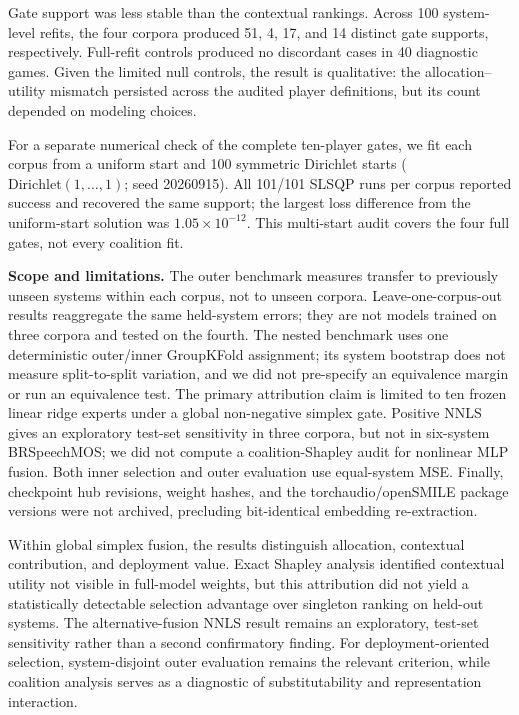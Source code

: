 \documentclass{article}
\begin{document}
Gate support was less stable than the contextual rankings. Across 100
system-level refits, the four corpora produced 51, 4, 17, and 14 distinct gate
supports, respectively. Full-refit controls produced no discordant cases in 40
diagnostic games. Given the limited null controls, the result is qualitative:
the allocation--utility mismatch persisted across the audited player
definitions, but its count depended on modeling choices.

For a separate numerical check of the complete ten-player gates, we fit each
corpus from a uniform start and 100 symmetric Dirichlet starts
($\mathrm{Dirichlet}(1,\ldots,1)$; seed 20260915). All 101/101 SLSQP runs per
corpus reported success and recovered the same support; the largest loss
difference from the uniform-start solution was $1.05\times10^{-12}$. This
multi-start audit covers the four full gates, not every coalition fit.

\balance
\textbf{Scope and limitations.}
The outer benchmark measures transfer to previously unseen systems within each
corpus, not to unseen corpora. Leave-one-corpus-out results reaggregate the same
held-system errors; they are not models trained on three corpora and tested on
the fourth. The nested benchmark uses one deterministic outer/inner GroupKFold
assignment; its system bootstrap does not measure split-to-split variation, and
we did not pre-specify an equivalence margin or run an equivalence test. The
primary attribution claim is limited to ten frozen linear ridge experts under
a global non-negative simplex gate. Positive NNLS gives an exploratory
test-set sensitivity in three corpora, but not in six-system BRSpeechMOS;
we did not compute a coalition-Shapley audit for nonlinear MLP fusion. Both
inner selection and outer evaluation use equal-system MSE. Finally, checkpoint
hub revisions, weight hashes, and the torchaudio/openSMILE package versions
were not archived, precluding bit-identical embedding re-extraction.

Within global simplex fusion, the results distinguish allocation, contextual
contribution, and deployment value. Exact Shapley analysis identified
contextual utility not visible in full-model weights, but this attribution
did not yield a statistically detectable selection advantage over singleton
ranking on held-out systems. The alternative-fusion NNLS result remains an
exploratory, test-set sensitivity rather than a second confirmatory finding.
For deployment-oriented selection, system-disjoint outer evaluation remains
the relevant criterion, while coalition analysis serves as a diagnostic of
substitutability and representation interaction.
\end{document}
